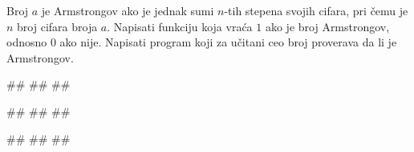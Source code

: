 \begin{Exercise}[label=p1.4_15]
Broj $a$ je Armstrongov ako je jednak sumi $n$-tih stepena svojih cifara, pri čemu je $n$ broj cifara broja $a$.
Napisati funkciju  koja vraća $1$ ako je broj Armstrongov, odnosno $0$ ako nije.
Napisati program koji za učitani ceo broj proverava da li je Armstrongov.

\begin{miditest}
\begin{upotreba}{1}
#\naslovInt#
##
##
\end{upotreba}
\end{miditest}
\begin{miditest}
\begin{upotreba}{2}
#\naslovInt#
##
##
\end{upotreba}
\end{miditest}

\begin{miditest}
\begin{upotreba}{3}
#\naslovInt#
##
##
\end{upotreba}
\end{miditest}

\end{Exercise}
\begin{Answer}[ref=p1.4_15]
\end{Answer}


